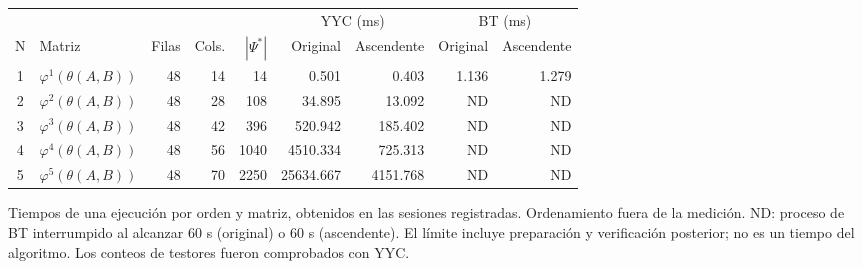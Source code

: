 {\scriptsize
\begin{tabular}{c l r r r r r r r}
\toprule
\multicolumn{5}{c}{} & \multicolumn{2}{c}{YYC (ms)} & \multicolumn{2}{c}{BT (ms)} \\
\cmidrule(lr){6-7}\cmidrule(lr){8-9}
N & Matriz & Filas & Cols. & $|\Psi^*|$ & Original & Ascendente & Original & Ascendente \\
\midrule
1 & $\varphi^{1}(\theta(A,B))$ & 48 & 14 & 14 & 0.501 & 0.403 & 1.136 & 1.279 \\
2 & $\varphi^{2}(\theta(A,B))$ & 48 & 28 & 108 & 34.895 & 13.092 & ND & ND \\
3 & $\varphi^{3}(\theta(A,B))$ & 48 & 42 & 396 & 520.942 & 185.402 & ND & ND \\
4 & $\varphi^{4}(\theta(A,B))$ & 48 & 56 & 1040 & 4510.334 & 725.313 & ND & ND \\
5 & $\varphi^{5}(\theta(A,B))$ & 48 & 70 & 2250 & 25634.667 & 4151.768 & ND & ND \\
\bottomrule
\end{tabular}
}
{\footnotesize Tiempos de una ejecución por orden y matriz, obtenidos en las sesiones registradas. Ordenamiento fuera de la medición. ND: proceso de BT interrumpido al alcanzar 60 s (original) o 60 s (ascendente). El límite incluye preparación y verificación posterior; no es un tiempo del algoritmo. Los conteos de testores fueron comprobados con YYC.\par}
